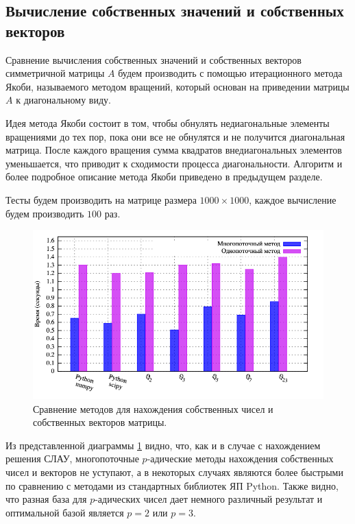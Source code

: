 \documentclass[master, och, diploma, times]{sty/SCWorks}
\theoremstyle{plain}
\theoremstyle{definition}
\numberwithin{equation}{section}
\begin{document}
\subsection{Вычисление собственных значений и собственных векторов}
Сравнение вычисления собственных значений и собственных векторов симметричной матрицы $A$ будем производить с помощью итерационного метода Якоби, называемого методом вращений, который основан на приведении матрицы $A$ к диагональному виду.

Идея метода Якоби состоит в том, чтобы обнулять недиагональные элементы вращениями до тех пор, пока они все не обнулятся и не получится диагональная матрица. После каждого вращения сумма квадратов внедиагональных элементов уменьшается, что приводит к сходимости процесса диагональности. Алгоритм и более подробное описание метода Якоби приведено в предыдущем разделе.

Тесты будем производить на матрице размера $1000 \times 1000$, каждое вычисление будем производить $100$ раз.

\begin{figure}[H]
\centerline{\includegraphics[width=0.85\linewidth]{../gnuplot/multi/jacoby/plot.png}}
\caption{Сравнение методов для нахождения собственных чисел и собственных векторов матрицы.}
\label{img:multi:jacoby}
\end{figure}

Из представленной диаграммы \ref{img:multi:jacoby} видно, что, как и в случае с нахождением решения СЛАУ, многопоточные $p$-адические методы нахождения собственных чисел и векторов не уступают, а в некоторых случаях являются более быстрыми по сравнению с методами из стандартных библиотек ЯП Python. Также видно, что разная база для $p$-адических чисел дает немного различный результат и оптимальной базой является $p=2$ или $p=3$.
\end{document}
